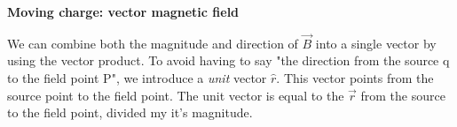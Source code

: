 \documentclass[11pt]{article}
\begin{document}
\begin{flushleft}
        \bigskip

        \textbf{Moving charge: vector magnetic field}\par 
        We can combine both the magnitude and direction of $\vec{B}$ into a single vector by using the vector product.
        To avoid having to say "the direction from the source q to the field point P", we introduce a \emph{unit} vector $\hat{r}$.
        This vector points from the source point to the field point. The unit vector is equal to the $\vec{r}$ from the source to the field point, divided my it's magnitude.
          


    \end{flushleft}
\end{document}
